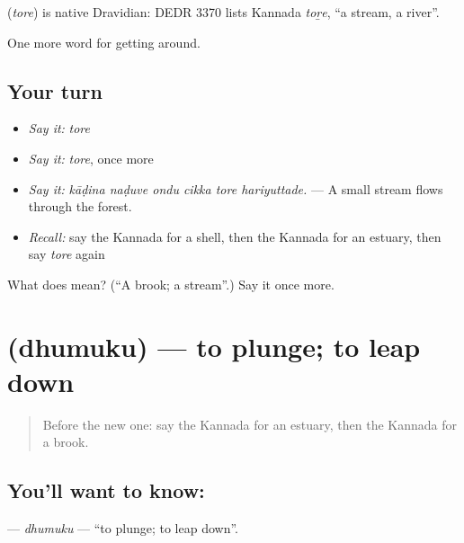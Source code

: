 \begin{cousinweb}
\textbf{} (\emph{tore}) is native Dravidian: DEDR 3370 lists Kannada \emph{toṟe}, \textquotedblleft{}a stream, a river\textquotedblright{}.
\end{cousinweb}

\begin{grammarlens}[title={What you've built}]
One more word for getting around.
\end{grammarlens}

\subsection*{Your turn}
\begin{itemize}
\raggedright
  \item \emph{Say it:} \emph{tore}
  \item \emph{Say it:} \emph{tore}, once more
  \item \emph{Say it:} \emph{kāḍina naḍuve ondu cikka tore hariyuttade.} — A small stream flows through the forest.
  \item \emph{Recall:} say the Kannada for a shell, then the Kannada for an estuary, then say \emph{tore} again
\end{itemize}

\begin{tcolorbox}[breakable,colback=teal!4,colframe=teal!35!black,title={Before you move on}]
What does  mean? (\textquotedblleft{}A brook; a stream\textquotedblright{}.) Say it once more.
\end{tcolorbox}
\section[\texorpdfstring{\kn{ಧುಮುಕು} (dhumuku)}{ಧುಮುಕು (dhumuku)}]{ (dhumuku) — to plunge; to leap down}

\label{lesson:KA-C482-dhumuku}



\begin{quote}
Before the new one: say the Kannada for an estuary, then the Kannada for a brook.
\end{quote}

\subsection*{You'll want to know: }
\textbf{} — \emph{dhumuku} — \textquotedblleft{}to plunge; to leap down\textquotedblright{}.

